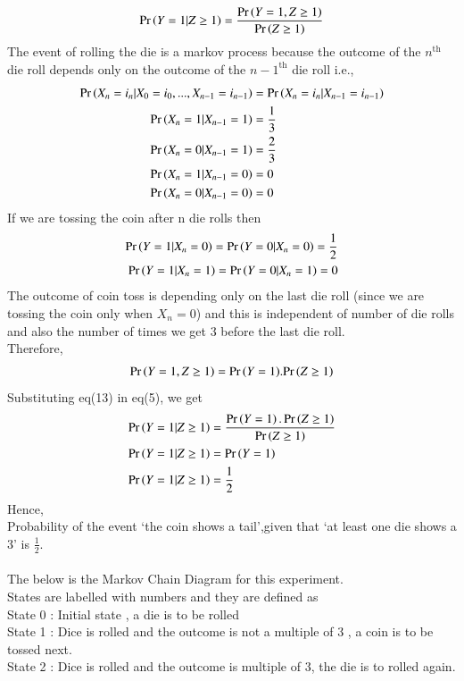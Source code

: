 \documentclass[journal,12pt,twocolumn]{IEEEtran}
\begin{document}
\begin{align}
    \Pr\left(Y=1|Z\geq 1\right)=\frac{\Pr\left(Y=1,Z\geq 1\right)}{\Pr\left(Z \geq 1\right)}
\end{align}
The event of rolling the die is a markov process because the outcome of the $n^{\text{th}}$ die roll depends only on the outcome of the ${n-1}^{\text{th}}$ die roll i.e.,
\begin{align}
       \Pr\left(X_n =i_n|X_0=i_0,...,X_{n-1}=i_{n-1}\right)&= \Pr\left(X_n=i_n|X_{n-1}=i_{n-1}\right)\\
       \Pr\left(X_n=1|X_{n-1}=1\right)&=\frac{1}{3}\\
       \Pr\left(X_n=0|X_{n-1}=1\right)&=\frac{2}{3}\\
       \Pr\left(X_n=1|X_{n-1}=0\right)&=0\\
       \Pr\left(X_n=0|X_{n-1}=0\right)&=0
\end{align}
If we are tossing the coin after n die rolls then
\begin{align}
       \Pr\left(Y=1|X_n =0\right)=\Pr\left(Y=0|X_n=0\right)=\frac{1}{2}\\
        \Pr\left(Y=1|X_n =1\right)=\Pr\left(Y=0|X_n=1\right)=0
\end{align}
The outcome of coin toss is depending only on the last die roll (since we are tossing the coin only when $X_n=0$) and this is independent of number of die rolls and also the number of times we get 3 before the last die roll.
\\Therefore,
\begin{align}
       \Pr\left(Y=1,Z\geq 1\right)={\Pr\left(Y=1\right)}.{\Pr\left(Z\geq 1\right)}
\end{align}
Substituting eq(13) in eq(5), we get
\begin{align}
    \Pr\left(Y=1|Z\geq 1\right)&=\frac{\Pr\left(Y=1\right).\Pr\left(Z\geq 1\right)}{\Pr\left(Z \geq 1\right)}\\
    \Pr\left(Y=1|Z \geq 1\right) &= \Pr\left(Y=1\right)\\
    \Pr\left(Y=1|Z \geq 1\right) &= \frac{1}{2}
\end{align}
Hence,
\\Probability of the event `the coin shows a tail',given that `at least one die shows a 3' is $\frac{1}{2}$.
\\
\\The below is the Markov Chain Diagram for this experiment.
\\ States are labelled with numbers and they are defined as
\\ State 0 : Initial state , a die is to be rolled
\\ State 1 : Dice is rolled and the outcome is not a multiple of 3 , a coin is to be tossed next.
\\ State 2 : Dice is rolled and the outcome is multiple of 3, the die is to rolled again.
\end{document}
